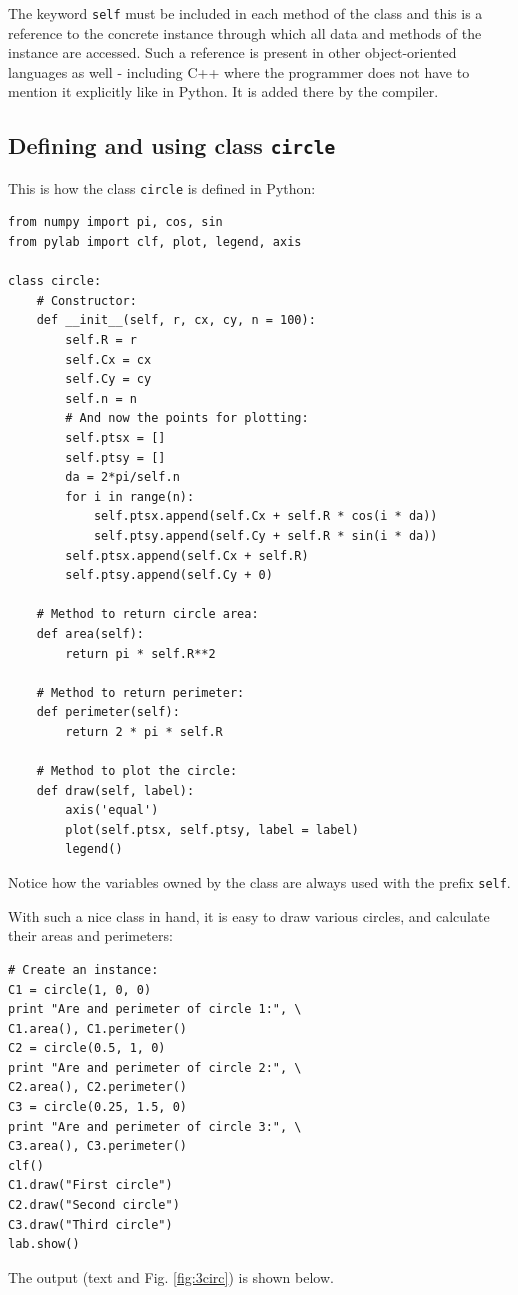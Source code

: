 The keyword {\tt self} must be included in each method of the class 
and this is a reference to the concrete instance through which all
data and methods of the instance are accessed. Such a reference is present 
in other object-oriented languages as well - including C++ where the programmer
does not have to mention it explicitly like in Python. It is added there by 
the compiler.

\subsection{Defining and using class {\tt circle}}

This is how the class {\tt circle} is defined in Python:

\begin{verbatim}
from numpy import pi, cos, sin
from pylab import clf, plot, legend, axis

class circle:
    # Constructor:
    def __init__(self, r, cx, cy, n = 100):
        self.R = r
        self.Cx = cx
        self.Cy = cy
        self.n = n
        # And now the points for plotting:
        self.ptsx = []
        self.ptsy = []
        da = 2*pi/self.n
        for i in range(n):
            self.ptsx.append(self.Cx + self.R * cos(i * da))
            self.ptsy.append(self.Cy + self.R * sin(i * da))
        self.ptsx.append(self.Cx + self.R)
        self.ptsy.append(self.Cy + 0)
            
    # Method to return circle area:
    def area(self):
        return pi * self.R**2
      
    # Method to return perimeter:
    def perimeter(self):
        return 2 * pi * self.R
      
    # Method to plot the circle:
    def draw(self, label):
        axis('equal')
        plot(self.ptsx, self.ptsy, label = label)
        legend()
\end{verbatim}
Notice how the variables owned by the class are always used with the 
prefix {\tt self}.

With such a nice class in hand, it is easy to draw various circles,
and calculate their areas and perimeters:
\begin{verbatim}        
# Create an instance:
C1 = circle(1, 0, 0)
print "Are and perimeter of circle 1:", \
C1.area(), C1.perimeter()
C2 = circle(0.5, 1, 0)
print "Are and perimeter of circle 2:", \
C2.area(), C2.perimeter()
C3 = circle(0.25, 1.5, 0)
print "Are and perimeter of circle 3:", \
C3.area(), C3.perimeter()
clf()
C1.draw("First circle")
C2.draw("Second circle")
C3.draw("Third circle")
lab.show()
\end{verbatim}
The output (text and Fig. \ref{fig:3circ}) is shown below.


